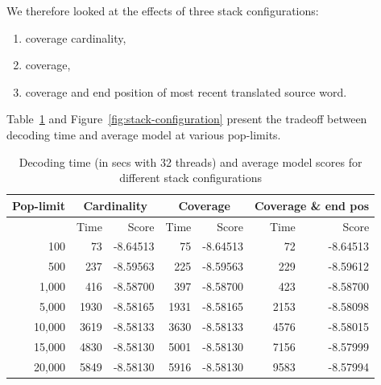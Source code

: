 \documentclass[11pt]{article}
\begin{document}
We therefore looked at the effects of three stack configurations:
\begin{enumerate}
  \item \vspace{-2 mm} coverage cardinality,
  \item \vspace{-2 mm} coverage,
  \item \vspace{-2 mm} coverage and end position of most recent translated source word.
\end{enumerate}
Table~\ref{tab:stack-configuration} and Figure~\ref{fig:stack-configuration} present the tradeoff between decoding time and average model at various pop-limits.
\begin{table}[t]
\small
\begin{center}
\begin{tabular}{|r|r|r|r|r|r|r|} \hline
Pop-limit	& \multicolumn{2}{c|}{Cardinality}	& \multicolumn{2}{c|}{Coverage}	& \multicolumn{2}{c|}{Coverage \& end pos} \\ \hline
		& Time		& Score			& Time		& Score		& Time		& Score	\\ \hline
100  		& 73		& -8.64513 		& 75		& -8.64513	& 72	& -8.64513 \\
500		& 237		& -8.59563		& 225		& -8.59563 	& 229	& -8.59612 \\
1,000	 	& 416		& -8.58700		& 397		& -8.58700	& 423	& -8.58700 \\ 
5,000 		& 1930		& -8.58165		& 1931		& -8.58165	& 2153	& -8.58098 \\ 
10,000 		& 3619		& -8.58133		& 3630		& -8.58133	& 4576	& -8.58015 \\ 
15,000 		& 4830		& -8.58130		& 5001		& -8.58130	& 7156	& -8.57999 \\ 
20,000 		& 5849		& -8.58130		& 5916		& -8.58130	& 9583	& -8.57994 \\ \hline
\end{tabular}
\end{center}
\caption{Decoding time (in secs with 32 threads) and average model scores for different stack configurations}
\label{tab:stack-configuration}
\end{table}
\end{document}
